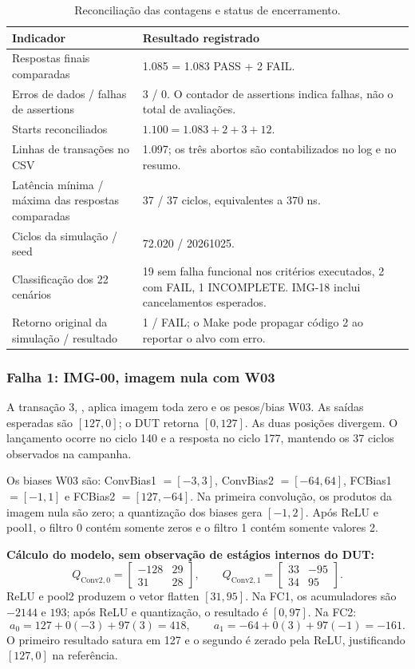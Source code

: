 \documentclass[12pt,a4paper]{article}
\newcommand{\arquivo}[1]{\texttt{\detokenize{#1}}}
\begin{document}
\begin{table}[H]\centering\small
\begin{tabularx}{\textwidth}{p{12cm}X}\toprule
\textbf{Indicador} & \textbf{Resultado registrado}\\\midrule
Respostas finais comparadas & 1.085 = 1.083 PASS + 2 FAIL.\\
Erros de dados / falhas de assertions & 3 / 0. O contador de assertions indica falhas, não o total de avaliações.\\
Starts reconciliados & $1.100=1.083+2+3+12$.\\
Linhas de transações no CSV & 1.097; os três abortos são contabilizados no log e no resumo.\\
Latência mínima / máxima das respostas comparadas & 37 / 37 ciclos, equivalentes a 370 ns.\\
Ciclos da simulação / seed & 72.020 / 20261025.\\
Classificação dos 22 cenários & 19 sem falha funcional nos critérios executados, 2 com FAIL, 1 INCOMPLETE. IMG-18 inclui cancelamentos esperados.\\
Retorno original da simulação / resultado & 1 / FAIL; o Make pode propagar código 2 ao reportar o alvo com erro.\\\bottomrule
\end{tabularx}
\caption{Reconciliação das contagens e status de encerramento.}
\end{table}

\subsubsection{Falha 1: IMG-00, imagem nula com W03}
A transação 3, \arquivo{zero_com_bias_W03}, aplica imagem toda zero e os pesos/bias W03. As saídas esperadas são $[127,0]$; o DUT retorna $[0,127]$. As duas posições divergem. O lançamento ocorre no ciclo 140 e a resposta no ciclo 177, mantendo os 37 ciclos observados na campanha.

Os biases W03 são: ConvBias1 $=[-3,3]$, ConvBias2 $=[-64,64]$, FCBias1 $=[-1,1]$ e FCBias2 $=[127,-64]$. Na primeira convolução, os produtos da imagem nula são zero; a quantização dos biases gera $[-1,2]$. Após ReLU e pool1, o filtro 0 contém somente zeros e o filtro 1 contém somente valores 2.

\textbf{Cálculo do modelo, sem observação de estágios internos do DUT:}
\[
Q_{\mathrm{Conv2},0}=\begin{bmatrix}-128&29\\31&28\end{bmatrix},\qquad
Q_{\mathrm{Conv2},1}=\begin{bmatrix}33&-95\\34&95\end{bmatrix}.
\]
ReLU e pool2 produzem o vetor flatten $[31,95]$. Na FC1, os acumuladores são $-2144$ e $193$; após ReLU e quantização, o resultado é $[0,97]$. Na FC2:
\[
a_0=127+0(-3)+97(3)=418,\qquad
a_1=-64+0(3)+97(-1)=-161.
\]
O primeiro resultado satura em 127 e o segundo é zerado pela ReLU, justificando $[127,0]$ na referência.
\end{document}
